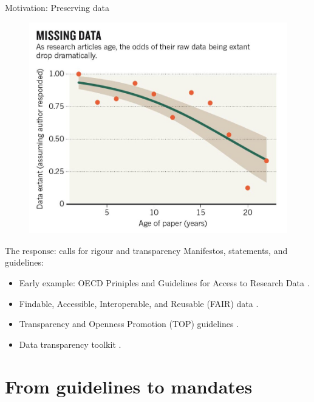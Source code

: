 \documentclass[aspectratio=169, 11pt]{beamer} %
\begin{document}
\begin{frame}{Motivation: Preserving data}
 \begin{figure}[H]
    \centering
        \includegraphics[height=.75\textheight]{figures/Missing-Data.png}
        \caption{\cite{Vines2014-zr}}
        \label{fig:vines2014}
 \end{figure}
\end{frame}

\begin{frame}{The response: calls for rigour and transparency}
  Manifestos, statements, and guidelines:
    \begin{itemize}[label=\textbullet]
        \item Early example: OECD Priniples and Guidelines for Access to Research Data \cite{Oecd2007-vi}.
        \item Findable, Accessible, Interoperable, and Reusable (FAIR) data \cite{Wilkinson2016-mr, Go-fair2017-vs}.
        \item Transparency and Openness Promotion (TOP) guidelines \cite{Nosek2015-wm, Cos2019-mr}.
        \item Data transparency toolkit \cite{Perkel2018-rw}.
    \end{itemize}
\end{frame}

\section{From guidelines to mandates}
\end{document}
